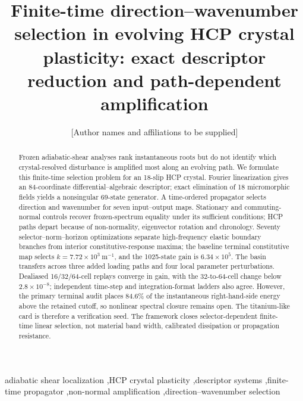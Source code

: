 \documentclass[preprint,12pt]{elsarticle}
\begin{document}
\begin{frontmatter}

\title{Finite-time direction--wavenumber selection in evolving HCP crystal plasticity: exact descriptor reduction and path-dependent amplification}

\author{[Author names and affiliations to be supplied]}

\begin{abstract}
Frozen adiabatic-shear analyses rank instantaneous roots but do not identify
which crystal-resolved disturbance is amplified most along an evolving path.
We formulate this finite-time selection problem for an 18-slip HCP crystal.
Fourier linearization gives an 84-coordinate differential--algebraic
descriptor; exact elimination of 18 micromorphic fields yields a nonsingular
69-state generator.  A time-ordered propagator selects direction and
wavenumber for seven input--output maps.  Stationary and commuting-normal
controls recover frozen-spectrum equality under its sufficient conditions;
HCP paths depart because of non-normality, eigenvector rotation and chronology.
Seventy selector--norm--horizon optimizations separate high-frequency elastic
boundary branches from interior constitutive-response maxima; the baseline
terminal constitutive map selects $k=7.72\times10^3~\mathrm{m^{-1}}$, and the
1025-state gain is $6.34\times10^5$.  The basin transfers across three added loading paths and
four local parameter perturbations.  Dealiased 16/32/64-cell replays converge
in gain, with the 32-to-64-cell change below $2.8\times10^{-8}$; independent
time-step and integration-format ladders also agree.  However, the primary
terminal audit places 84.6\% of the instantaneous right-hand-side energy
above the retained cutoff, so nonlinear spectral closure remains open.  The
titanium-like card is therefore a verification seed.  The framework closes
selector-dependent finite-time linear selection, not material band width,
calibrated dissipation or propagation resistance.
\end{abstract}

\begin{keyword}
adiabatic shear localization \sep HCP crystal plasticity \sep descriptor systems \sep finite-time propagator \sep non-normal amplification \sep direction--wavenumber selection
\end{keyword}

\end{frontmatter}




\end{document}
